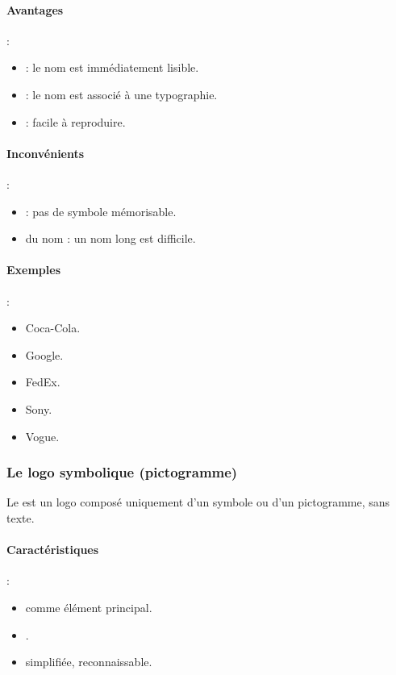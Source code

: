 \paragraph{Avantages} :
\begin{itemize}
    \item {} : le nom est immédiatement lisible.
    \item {} : le nom est associé à une typographie.
    \item {} : facile à reproduire.
\end{itemize}

\paragraph{Inconvénients} :
\begin{itemize}
    \item {} : pas de symbole mémorisable.
    \item {} du nom : un nom long est difficile.
\end{itemize}

\paragraph{Exemples} :
\begin{itemize}
    \item Coca-Cola.
    \item Google.
    \item FedEx.
    \item Sony.
    \item Vogue.
\end{itemize}

\subsubsection{Le logo symbolique (pictogramme)}

Le  est un logo composé uniquement d'un symbole ou d'un pictogramme, sans texte.

\paragraph{Caractéristiques} :
\begin{itemize}
    \item {} comme élément principal.
    \item {}.
    \item {} simplifiée, reconnaissable.
\end{itemize}

